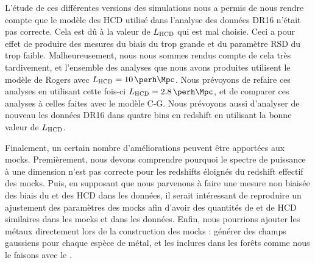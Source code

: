 L'étude de ces différentes versions des simulations nous a permis de nous rendre compte que le modèle des HCD utilisé dans l'analyse des données DR16 n'était pas correcte. Cela est dû à la valeur de $L_{\textsc{HCD}}$ qui est mal choisie. Ceci a pour effet de produire des mesures du biais du \lya{} trop grande et du paramètre RSD du \lya{} trop faible.
Malheureusement, nous nous sommes rendus compte de cela très tardivement, et l'ensemble des analyses que nous avons produites utilisent le modèle de Rogers avec $L_{\textsc{HCD}} = \SI{10}{\perh\Mpc}$. Nous prévoyons de refaire ces analyses en utilisant cette fois-ci $L_{\textsc{HCD}} = \SI{2.8}{\perh\Mpc}$, et de comparer ces analyses à celles faites avec le modèle C-G.
Nous prévoyons aussi d'analyser de nouveau les données DR16 dans quatre bins en redshift en utilisant la bonne valeur de $L_{\textsc{HCD}}$.

Finalement, un certain nombre d'améliorations peuvent être apportées aux mocks. Premièrement, nous devons comprendre pourquoi le spectre de puissance à une dimension n'est pas correcte pour les redshifts éloignés du redshift effectif des mocks.
Puis, en supposant que nous parvenons à faire une mesure non biaisée des biais du \lya{} et des HCD dans les données, il serait intéressant de reproduire un ajustement des paramètres des mocks afin d'avoir des quantités de \lya{} et de HCD similaires dans les mocks et dans les données.
Enfin, nous pourrions ajouter les métaux directement lors de la construction des mocks : générer des champs gaussiens pour chaque espèce de métal, et les inclures dans les forêts comme nous le faisons avec le \lya{}.
